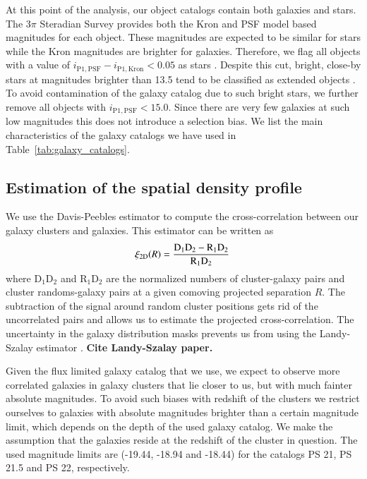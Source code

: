 \documentclass[iop, apjl, twocolappendix, numberedappendix]{emulateapj}
\begin{document}
At this point of the analysis, our object catalogs contain both
galaxies and stars. The 3$\pi$ Steradian Survey provides both the
Kron and PSF model based magnitudes for each object. These
magnitudes are expected to be similar for stars while the Kron
magnitudes are brighter for galaxies. Therefore, we flag all objects
with a value of $i_{\mathrm{P1,PSF}} - i_{\mathrm{P1,Kron}}< 0.05$
as stars \citep{farrow2013pan}. Despite this cut, bright, close-by
stars at magnitudes brighter than 13.5 tend to be classified as
extended objects \citep{chambers2016pan}. To avoid contamination of
the galaxy catalog due to such bright stars, we further remove all
objects with $i_{\mathrm{P1,PSF}} < 15.0$. Since there are very few
galaxies at such low magnitudes this does not introduce a selection
bias. We list the main characteristics of the galaxy catalogs we
have used in Table~\ref{tab:galaxy_catalogs}.

\subsection{Estimation of the spatial density profile}
\label{sec:estimators}

We use the Davis-Peebles estimator \citep{davis1983survey} to
compute the cross-correlation between our galaxy clusters and
galaxies. This estimator can be written as
\begin{equation}
\xi_{\rm 2D}(R) = \frac{\rm D_1D_2-R_1D_2}{\rm R_1D_2}\,
\end{equation}
where D$_1$D$_2$ and R$_1$D$_2$ are the normalized numbers of
cluster-galaxy pairs and cluster randoms-galaxy pairs at a given
comoving projected separation $R$. The subtraction of the signal
around random cluster positions gets rid of the uncorrelated pairs and allows
us to estimate the projected cross-correlation. The uncertainty in the galaxy
distribution masks prevents us from using the Landy-Szalay estimator \citep{landy1993bias}. 
{\bf Cite Landy-Szalay paper.}

Given the flux limited galaxy catalog that we use, we expect to
observe more correlated galaxies in galaxy clusters that lie closer
to us, but with much fainter absolute magnitudes. To avoid
such biases with redshift of the clusters we restrict ourselves to
galaxies with absolute magnitudes brighter than a certain magnitude
limit, which depends on the depth of the used galaxy catalog. We
make the assumption that the galaxies reside at the redshift of the
cluster in question. The used magnitude limits are (-19.44, -18.94
and -18.44) for the catalogs PS 21, PS 21.5 and PS 22, respectively.
\end{document}

